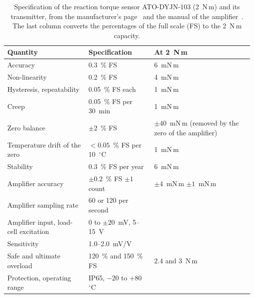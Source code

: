 \begin{table}[htbp]
    \centering
    \caption[Specification of the torque sensor]{Specification of the reaction torque sensor ATO-DYJN-103 (2~N\,m) and its transmitter, from the manufacturer's page~\citep{atotqs2026,atoamp2026} and the manual of the amplifier~\citep{atoman2026}. The last column converts the percentages of the full scale (FS) to the 2~N\,m capacity.}
    \label{tab:atospec}
    \small
    \begin{tabular}{@{}lll@{}}
        \toprule
        Quantity & Specification & At 2~N\,m \\
        \midrule
        Accuracy & 0.3~\% FS & 6~mN\,m \\
        Non-linearity & 0.2~\% FS & 4~mN\,m \\
        Hysteresis, repeatability & 0.05~\% FS each & 1~mN\,m \\
        Creep & 0.05~\% FS per 30~min & 1~mN\,m \\
        Zero balance & $\pm2$~\% FS & $\pm40$~mN\,m (removed by the zero of the amplifier) \\
        Temperature drift of the zero & $<0.05$~\% FS per 10~$^{\circ}$C & 1~mN\,m \\
        Stability & 0.3~\% FS per year & 6~mN\,m \\
        Amplifier accuracy & $\pm0.2$~\% FS $\pm1$ count & $\pm4$~mN\,m $\pm1$~mN\,m \\
        Amplifier sampling rate & 60 or 120 per second & \\
        Amplifier input, load-cell excitation & 0 to $\pm20$~mV, 5--15~V & \\
        Sensitivity & 1.0--2.0~mV/V & \\
        Safe and ultimate overload & 120~\% and 150~\% FS & 2.4 and 3~N\,m \\
        Protection, operating range & IP65, $-20$ to $+80$~$^{\circ}$C & \\
        \bottomrule
    \end{tabular}
\end{table}

